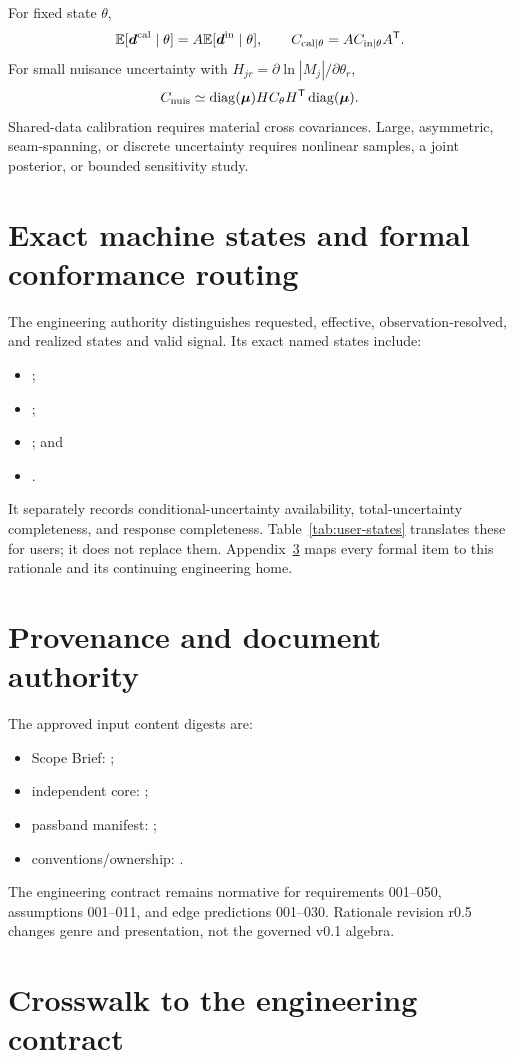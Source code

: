 \documentclass[11pt]{article}
\begin{document}
For fixed state \(\theta\),
\begin{equation}
\mathbb E[\boldsymbol d^{\rm cal}\mid\theta]=A\mathbb E[\boldsymbol d^{\rm in}\mid\theta],\qquad C_{\rm cal\mid\theta}=A C_{\rm in\mid\theta}A^{\mathsf T}.
\end{equation}
For small nuisance uncertainty with
\(H_{jr}=\partial\ln|M_j|/\partial\theta_r\),
\begin{equation}C_{\rm nuis}\simeq\operatorname{diag}(\boldsymbol\mu)H C_\theta H^{\mathsf T}\operatorname{diag}(\boldsymbol\mu).\end{equation}
Shared-data calibration requires material cross covariances. Large,
asymmetric, seam-spanning, or discrete uncertainty
requires nonlinear samples, a joint posterior, or bounded sensitivity study.

\section{Exact machine states and formal conformance routing}\label{app:states}
The engineering authority distinguishes requested, effective,
observation-resolved, and realized states and valid signal. Its exact named
states include:
\begin{itemize}
\item {};
\item {};
\item {}; and
\item {}.
\end{itemize}
It separately records conditional-uncertainty availability,
total-uncertainty completeness, and response completeness.
Table~\ref{tab:user-states} translates these for users; it does not replace
them. Appendix~\ref{app:crosswalk} maps every formal item to this rationale and
its continuing engineering home.

\section{Provenance and document authority}\label{app:provenance}
The approved input content digests are:
\begin{itemize}
\item Scope Brief: {\footnotesize{}};
\item independent core: {\footnotesize{}};
\item passband manifest: {\footnotesize{}};
\item conventions/ownership: {\footnotesize{}}.
\end{itemize}
The engineering contract remains normative for requirements 001--050,
assumptions 001--011, and edge predictions 001--030. Rationale revision r0.5
changes genre and presentation, not the governed v0.1 algebra.

\section{Crosswalk to the engineering contract}\label{app:crosswalk}

\end{document}
